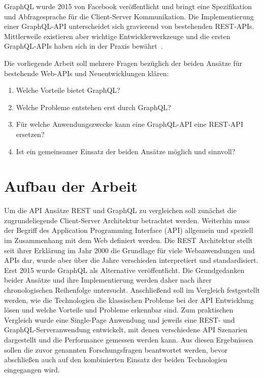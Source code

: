 \par
GraphQL wurde 2015 von Facebook veröffentlicht und bringt eine Spezifikation und Abfragesprache für die Client-Server Kommunikation.
Die Implementierung einer GraphQL-API unterscheidet sich gravierend von bestehenden REST-APIs.
Mittlerweile existieren aber wichtige Entwicklerwerkzeuge und die ersten GraphQL-APIs haben sich in der Praxis bewährt~\cite[vgl.][]{GitHubAPI}.
\par
Die vorliegende Arbeit soll mehrere Fragen bezüglich der beiden Ansätze für bestehende Web-APIs und Neuentwicklungen klären:
\begin{enumerate}
  \item Welche Vorteile bietet GraphQL\@?
  \item Welche Probleme entstehen erst durch GraphQL\@?
  \item Für welche Anwendungszwecke kann eine GraphQL-API eine REST-API ersetzen?
  \item Ist ein gemeinsamer Einsatz der beiden Ansätze möglich und sinnvoll?
\end{enumerate}

\section{Aufbau der Arbeit}
Um die API Ansätze REST und GraphQL zu vergleichen soll zunächst die zugrundeliegende Client-Server Architektur betrachtet werden.
Weiterhin muss der Begriff des Application Programming Interface (API) allgemein und speziell im Zusammenhang mit dem Web definiert werden.
Die REST Architektur stellt seit ihrer Erklärung im Jahr 2000 die Grundlage für viele Webanwendungen und APIs dar, wurde aber über die Jahre verschieden interpretiert und standardisiert.
Erst 2015 wurde GraphQL als Alternative veröffentlicht.
Die Grundgedanken beider Ansätze und ihre Implementierung werden daher nach ihrer chronologischen Reihenfolge untersucht.
Anschließend soll im Vergleich festgestellt werden, wie die Technologien die klassischen Probleme bei der API Entwicklung lösen und welche Vorteile und Probleme erkennbar sind.
Zum praktischen Vergleich wurde eine Single-Page Anwendung und jeweils eine REST- und GraphQL-Serveranwendung entwickelt, mit denen verschiedene API Szenarien dargestellt und die Performance gemessen werden kann.
Aus diesen Ergebnissen sollen die zuvor genannten Forschungsfragen beantwortet werden, bevor abschließen auch auf den kombinierten Einsatz der beiden Technologien eingegangen wird.
